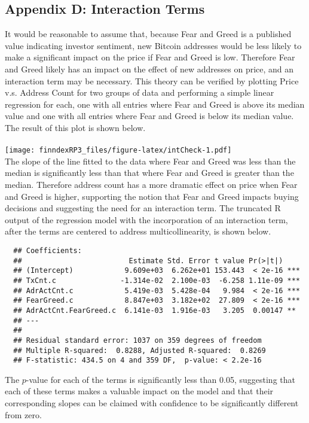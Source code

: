 \documentclass{article}
\begin{document}
\subsection{Appendix D: Interaction Terms}
It would be reasonable to assume that, because Fear and Greed is a published value indicating investor sentiment, new Bitcoin addresses would be less likely to make a significant impact on the price if Fear and Greed is low. Therefore Fear and Greed likely has an impact on the effect of new addresses on price, and an interaction term may be necessary. This theory can be verified by plotting Price v.s. Address Count for two groups of data and performing a simple linear regression for each, one with all entries where Fear and Greed is above its median value and one with all entries where Fear and Greed is below its median value. The result of this plot is shown below. \\~\\
\texttt{[image: finndexRP3\_files/figure-latex/intCheck-1.pdf]} \mbox{} \\
The slope of the line fitted to the data where Fear and Greed was less than the median is significantly less than that where Fear and Greed is greater than the median. Therefore address count has a more dramatic effect on price when Fear and Greed is higher, supporting the notion that Fear and Greed impacts buying decisions and suggesting the need for an interaction term. The truncated R output of the regression model with the incorporation of an interaction term, after the terms are centered to address multicollinearity, is shown below.
\begin{verbatim}
  ## Coefficients:
  ##                         Estimate Std. Error t value Pr(>|t|)    
  ## (Intercept)            9.609e+03  6.262e+01 153.443  < 2e-16 ***
  ## TxCnt.c               -1.314e-02  2.100e-03  -6.258 1.11e-09 ***
  ## AdrActCnt.c            5.419e-03  5.428e-04   9.984  < 2e-16 ***
  ## FearGreed.c            8.847e+03  3.182e+02  27.809  < 2e-16 ***
  ## AdrActCnt.FearGreed.c  6.141e-03  1.916e-03   3.205  0.00147 ** 
  ## ---
  ## 
  ## Residual standard error: 1037 on 359 degrees of freedom
  ## Multiple R-squared:  0.8288, Adjusted R-squared:  0.8269 
  ## F-statistic: 434.5 on 4 and 359 DF,  p-value: < 2.2e-16
  \end{verbatim}
  The $p$-value for each of the terms is significantly less than 0.05, suggesting that each of these terms makes a valuable impact on the model and that their corresponding slopes can be claimed with confidence to be significantly different from zero.
  \newpage
\end{document}
